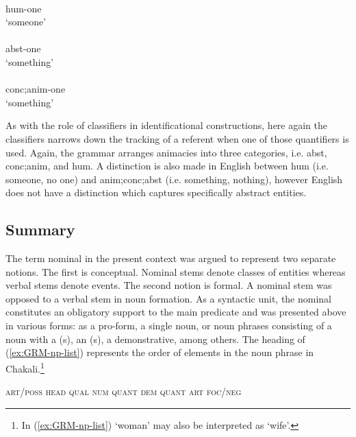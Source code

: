 \begin{exe}
\begin{exe}
\begin{exe}
\begin{exe}
\begin{exe}
\begin{exe}
\begin{exe}
\begin{exe}
\begin{exe}
\begin{exe}
\begin{exe}
\ea\label{ex:somethingH}
\\
 {\sc hum}-one\\
\glt `someone'\\
\ex\label{ex:somethingC}
\\
 {\sc abst}-one\\
\glt `something'\\
\ex\label{ex:somethingA}
\\
 {\sc conc;anim}-one\\
\glt `something'\\

\z
\z


As with the role of classifiers in identificational constructions, here again
the classifiers narrows down the tracking of a  referent when one of those
quantifiers is used. Again, the grammar  arranges  animacies into
three categories, i.e.  {\sc abst}, {\sc conc;anim}, and {\sc hum}.  A
distinction is also made in English between {\sc hum} (i.e. someone, no one) and
 {\sc anim;conc;abst} (i.e. something, nothing), however English does not have
a distinction which captures  specifically abstract entities.

\subsection{Summary}
\label{sec:GRM-NP-sum}

The term nominal in the present context was argued to represent two separate notions. The first is  conceptual. Nominal stems denote classes of entities whereas verbal stems denote events. The second notion is  formal. A nominal stem was opposed to  a verbal stem in noun formation.  As a syntactic unit,  the nominal  constitutes an obligatory support to the main predicate and was presented above in  various forms:   as a pro-form, a single noun, or noun phrases consisting of a noun with a (s), an (s), a demonstrative,  among others. The heading of (\ref{ex:GRM-np-list}) represents the order of elements in the noun phrase in Chakali.\footnote{In  (\ref{ex:GRM-np-list}) `woman' may also be interpreted as  `wife'.}


\ea\label{ex:GRM-np-list} {\small 
\textsc{art/poss} \;  \textsc{head}\;   \textsc{qual}\;  \textsc{num}  
\;  
 \textsc{quant} \;    \textsc{dem} \;   \textsc{quant} \;   \textsc{art} \;  
\textsc{foc/neg}}\\



\end{exe}
\end{exe}
\end{exe}
\end{exe}
\end{exe}
\end{exe}
\end{exe}
\end{exe}
\end{exe}
\end{exe}
\end{exe}
